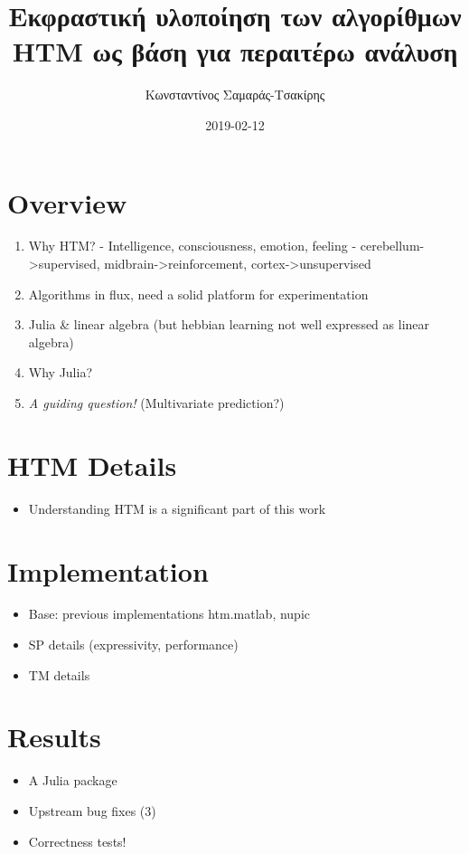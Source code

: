 \documentclass[a4paper,10pt]{article}
\title{Εκφραστική υλοποίηση των αλγορίθμων HTM ως βάση για περαιτέρω ανάλυση}
\author{Κωνσταντίνος Σαμαράς-Τσακίρης}
\date{2019-02-12}
\begin{document}
\maketitle

\section{Overview}
\begin{enumerate}
  \item Why HTM?
  - Intelligence, consciousness, emotion, feeling
  - {cerebellum->supervised, midbrain->reinforcement, cortex->unsupervised}
  \item Algorithms in flux, need a solid platform for experimentation
  \item Julia \& linear algebra (but hebbian learning not well expressed as linear algebra)
  \item Why Julia?
  \item \textit{A guiding question!} (Multivariate prediction?)
\end{enumerate}

\section{HTM Details}
\begin{itemize}
  \item Understanding HTM is a significant part of this work
\end{itemize}

\section{Implementation}
\begin{itemize}
  \item Base: previous implementations {htm.matlab, nupic}
  \item SP details (expressivity, performance)
  \item TM details
\end{itemize}

\section{Results}
\begin{itemize}
  \item A Julia package
  \item Upstream bug fixes (3)
  \item Correctness tests!
\end{itemize}
\end{document}
